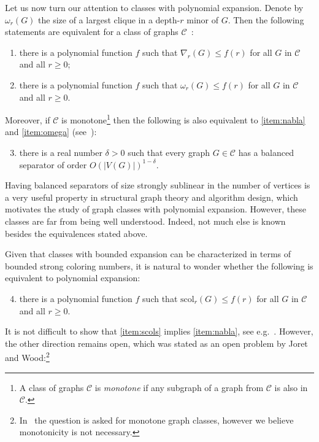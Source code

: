 \documentclass[final]{dmtcs-episciences}
\theoremstyle{definition}
\theoremstyle{remark}
\newcommand{\scol}{\ensuremath{\mathrm{scol}}}
\renewcommand{\leq}{\leqslant}
\renewcommand{\geq}{\geqslant}
\begin{document}
Let us now turn our attention to classes with polynomial expansion. 
Denote by $\omega_r(G)$ the size of a largest clique in a depth-$r$ minor of $G$. 
Then the following statements are equivalent for a class  of graphs $\mathcal{C}$~\cite{SparsityLectureNotes2019}: 
\begin{enumerate}
\item \label{item:nabla} there is a polynomial function $f$ such that $\nabla_r(G)\leq f(r)$ for all $G$ in $\mathcal{C}$ and all $r\geq0$;
\item \label{item:omega} there is a polynomial function $f$ such that $\omega_r(G)\leq f(r)$ for all $G$ in $\mathcal{C}$ and all $r\geq0$.
\end{enumerate}
Moreover, if $\mathcal{C}$ is monotone\footnote{A class of graphs $\mathcal{C}$ is {\em monotone} if any subgraph of a graph from $\mathcal{C}$ is also in $\mathcal{C}$.} then the following is also equivalent to  \eqref{item:nabla} and \eqref{item:omega} (see~\cite{DN16}): 
\begin{enumerate}
\setcounter{enumi}{2}
\item \label{item:separator} there is a real number $\delta>0$ such that every graph $G\in \mathcal{C}$ has a balanced separator of order $O(|V(G)|)^{1-\delta}$.
\end{enumerate}
Having balanced separators of size strongly sublinear in the number of vertices 
is a very useful property in structural graph theory and algorithm design, which motivates the study of graph classes with polynomial expansion. 
However, these classes are far from being well understood. 
Indeed, not much else is known besides the equivalences stated above. 

Given that classes with bounded expansion can be characterized in terms of bounded strong coloring numbers, it is natural to wonder whether the following is equivalent to polynomial expansion:

\begin{enumerate}
\setcounter{enumi}{3}
\item \label{item:scols} there is a polynomial function $f$ such that $\scol_r(G)\leq f(r)$ for all $G$ in $\mathcal{C}$ and all $r\geq0$.
\end{enumerate} 

It is not difficult to show that \eqref{item:scols} implies \eqref{item:nabla}, see e.g.\ \cite{ER2018, Sie25}. 
However, the other direction remains open, which was stated as an open problem by Joret and Wood:\footnote{In~\cite{ER2018} the question is asked for monotone graph classes, however we believe monotonicity is not necessary.}
 
\end{document}

